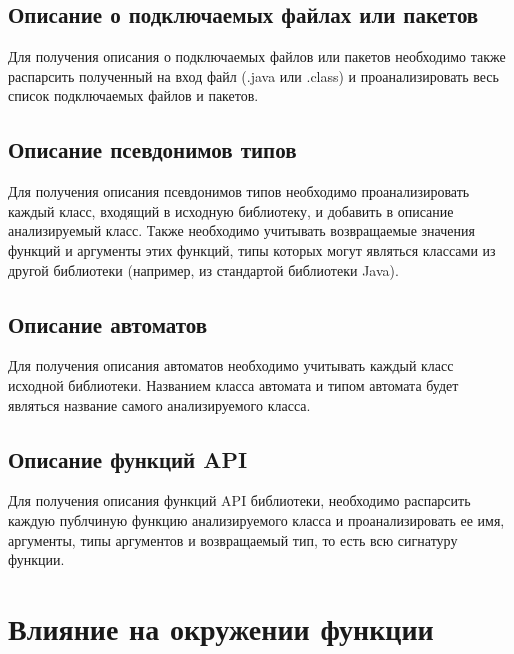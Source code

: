 \subsection{Описание о подключаемых файлах или пакетов}

Для получения описания о подключаемых файлов или пакетов необходимо также распарсить полученный на вход файл (.java или .class) и проанализировать весь список подключаемых файлов и пакетов.

\subsection{Описание псевдонимов типов}

Для получения описания псевдонимов типов необходимо проанализировать каждый класс, входящий в исходную библиотеку, и добавить в описание анализируемый класс.
Также необходимо учитывать возвращаемые значения функций и аргументы этих функций, типы которых могут являться классами из другой библиотеки (например, из стандартой библиотеки Java).

\subsection{Описание автоматов}

Для получения описания автоматов необходимо учитывать каждый класс исходной библиотеки.
Названием класса автомата и типом автомата будет являться название самого анализируемого класса.

\subsection{Описание функций API}

Для получения описания функций API библиотеки, необходимо распарсить каждую публчиную функцию анализируемого класса и проанализировать ее имя, аргументы, типы аргументов и возвращаемый тип, то есть всю сигнатуру функции.

\section{Влияние на окружении функции}


